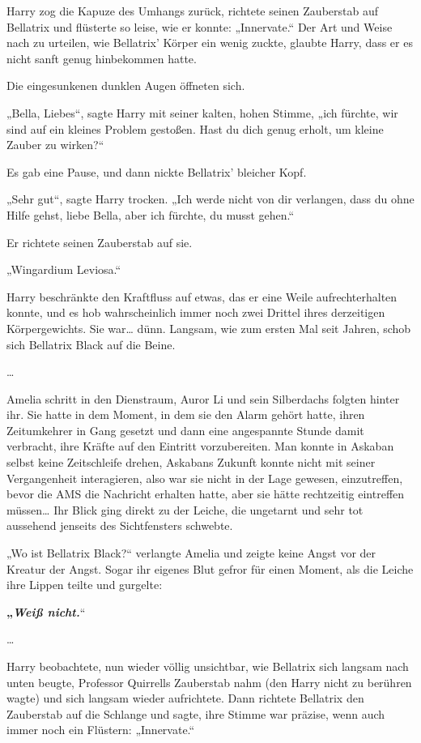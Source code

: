 {Harry zog die Kapuze des Umhangs zurück, richtete seinen Zauberstab auf Bellatrix und flüsterte so leise, wie er konnte: „Innervate.“ Der Art und Weise nach zu urteilen, wie Bellatrix' Körper ein wenig zuckte, glaubte Harry, dass er es nicht sanft genug hinbekommen hatte.

Die eingesunkenen dunklen Augen öffneten sich.

„Bella, Liebes“, sagte Harry mit seiner kalten, hohen Stimme, „ich fürchte, wir sind auf ein kleines Problem gestoßen. Hast du dich genug erholt, um kleine Zauber zu wirken?“

Es gab eine Pause, und dann nickte Bellatrix' bleicher Kopf.

„Sehr gut“, sagte Harry trocken. „Ich werde nicht von dir verlangen, dass du ohne Hilfe gehst, liebe Bella, aber ich fürchte, du musst gehen.“

Er richtete seinen Zauberstab auf sie.

„Wingardium Leviosa.“

Harry beschränkte den Kraftfluss auf etwas, das er eine Weile aufrechterhalten konnte, und es hob wahrscheinlich immer noch zwei Drittel ihres derzeitigen Körpergewichts. Sie war… dünn. Langsam, wie zum ersten Mal seit Jahren, schob sich Bellatrix Black auf die Beine.

…

Amelia schritt in den Dienstraum, Auror Li und sein Silberdachs folgten hinter ihr. Sie hatte in dem Moment, in dem sie den Alarm gehört hatte, ihren Zeitumkehrer in Gang gesetzt und dann eine angespannte Stunde damit verbracht, ihre Kräfte auf den Eintritt vorzubereiten. Man konnte in Askaban selbst keine Zeitschleife drehen, Askabans Zukunft konnte nicht mit seiner Vergangenheit interagieren, also war sie nicht in der Lage gewesen, einzutreffen, bevor die AMS die Nachricht erhalten hatte, aber sie hätte rechtzeitig eintreffen müssen… Ihr Blick ging direkt zu der Leiche, die ungetarnt und sehr tot aussehend jenseits des Sichtfensters schwebte.

„Wo ist Bellatrix Black?“ verlangte Amelia und zeigte keine Angst vor der Kreatur der Angst. Sogar ihr eigenes Blut gefror für einen Moment, als die Leiche ihre Lippen teilte und gurgelte:

\textbf{„\emph{Weiß nicht.}}“

…

Harry beobachtete, nun wieder völlig unsichtbar, wie Bellatrix sich langsam nach unten beugte, Professor Quirrells Zauberstab nahm (den Harry nicht zu berühren wagte) und sich langsam wieder aufrichtete. Dann richtete Bellatrix den Zauberstab auf die Schlange und sagte, ihre Stimme war präzise, wenn auch immer noch ein Flüstern: „Innervate.“

}
